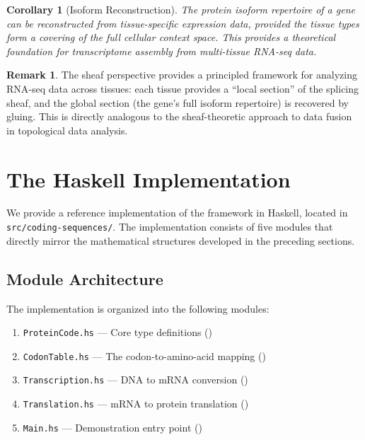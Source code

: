 \documentclass[12pt,a4paper]{article}
\newtheorem{corollary}[theorem]{Corollary}
\theoremstyle{definition}
\newtheorem{remark}[theorem]{Remark}
\begin{document}
\begin{corollary}[Isoform Reconstruction]\label{cor:isoform-reconstruction}
The protein isoform repertoire of a gene can be reconstructed from tissue-specific expression data, provided the tissue types form a covering of the full cellular context space. This provides a theoretical foundation for transcriptome assembly from multi-tissue RNA-seq data.
\end{corollary}

\begin{remark}
The sheaf perspective provides a principled framework for analyzing RNA-seq data across tissues: each tissue provides a ``local section'' of the splicing sheaf, and the global section (the gene's full isoform repertoire) is recovered by gluing. This is directly analogous to the sheaf-theoretic approach to data fusion in topological data analysis.
\end{remark}


\section{The Haskell Implementation}\label{sec:implementation}

We provide a reference implementation of the framework in Haskell, located in \texttt{src/coding-sequences/}. The implementation consists of five modules that directly mirror the mathematical structures developed in the preceding sections.

\subsection{Module Architecture}

The implementation is organized into the following modules:

\begin{enumerate}[label=(\arabic*)]
  \item \texttt{ProteinCode.hs} --- Core type definitions ()
  \item \texttt{CodonTable.hs} --- The codon-to-amino-acid mapping ()
  \item \texttt{Transcription.hs} --- DNA to mRNA conversion ()
  \item \texttt{Translation.hs} --- mRNA to protein translation ()
  \item \texttt{Main.hs} --- Demonstration entry point ()
\end{enumerate}
\end{document}
